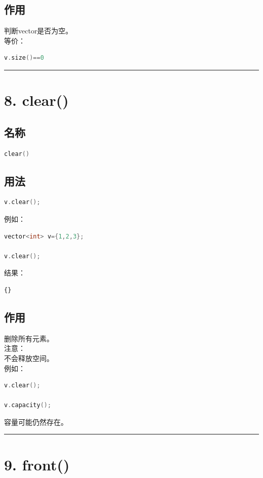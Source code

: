 \documentclass[10pt,twocolumn]{extarticle}
\begin{document}
\subsection{作用}
判断vector是否为空。\\
等价：
\begin{lstlisting}[language=C++]
v.size()==0
\end{lstlisting}

\noindent\rule{\linewidth}{0.4pt}

\section{8. clear()}

\subsection{名称}
\begin{lstlisting}[language=C++]
clear()
\end{lstlisting}

\subsection{用法}
\begin{lstlisting}[language=C++]
v.clear();
\end{lstlisting}
例如：
\begin{lstlisting}[language=C++]
vector<int> v={1,2,3};

v.clear();
\end{lstlisting}
结果：
\begin{lstlisting}
{}
\end{lstlisting}

\subsection{作用}
删除所有元素。\\
注意：\\
不会释放空间。\\
例如：
\begin{lstlisting}[language=C++]
v.clear();

v.capacity();
\end{lstlisting}
容量可能仍然存在。

\noindent\rule{\linewidth}{0.4pt}

\section{9. front()}
\end{document}
